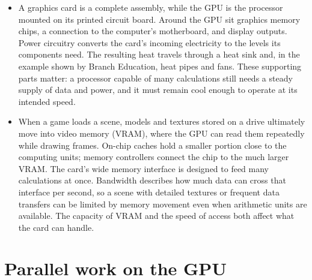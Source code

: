 \documentclass[10pt]{article}
\begin{document}
\begin{itemize}[leftmargin=1.25em, itemsep=0.3em, parsep=0pt, topsep=0pt]
    \item A graphics card is a complete assembly, while the GPU is the processor mounted on its printed circuit board. Around the GPU sit graphics memory chips, a connection to the computer's motherboard, and display outputs. Power circuitry converts the card's incoming electricity to the levels its components need. The resulting heat travels through a heat sink and, in the example shown by Branch Education, heat pipes and fans. These supporting parts matter: a processor capable of many calculations still needs a steady supply of data and power, and it must remain cool enough to operate at its intended speed.

    \item When a game loads a scene, models and textures stored on a drive ultimately move into video memory (VRAM), where the GPU can read them repeatedly while drawing frames. On-chip caches hold a smaller portion close to the computing units; memory controllers connect the chip to the much larger VRAM. The card's wide memory interface is designed to feed many calculations at once. Bandwidth describes how much data can cross that interface per second, so a scene with detailed textures or frequent data transfers can be limited by memory movement even when arithmetic units are available. The capacity of VRAM and the speed of access both affect what the card can handle.
\end{itemize}

\section*{Parallel work on the GPU}
\end{document}
